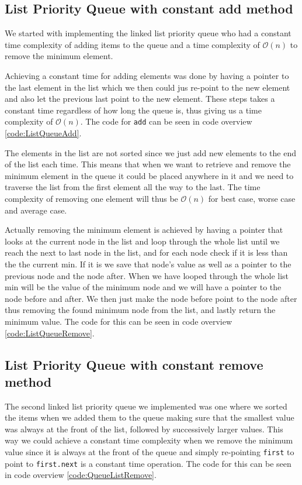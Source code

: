 \documentclass[a4paper,11pt]{article}
\begin{document}
\subsection{List Priority Queue with constant add method}
\label{ListQueue}
We started with implementing the linked list priority queue who had a constant time complexity of adding items 
to the queue and a time complexity of $\mathcal{O}(n)$ to remove the minimum element. 

Achieving a constant time for 
adding elements was done by having a pointer to the last element in the list which we then could jus re-point to 
the new element and also let the previous last point to the new element. These steps takes a constant time regardless 
of how long the queue is, thus giving us a time complexity of $\mathcal{O}(n)$. The code for {\tt add} can be seen
in code overview \ref{code:ListQueueAdd}.

The elements in the list are not sorted since we just add new elements to the end of the list each time. This means 
that when we want to retrieve and remove the minimum element in the queue it could be placed anywhere in it and 
we need to traverse the list from the first element all the way to the last. The time complexity of 
removing one element will thus be $\mathcal{O}(n)$ for best case, worse case and average case. 

Actually removing the minimum element is achieved by having a pointer that looks at the current node in the list and 
loop through the whole list until we reach the next to last node in the list, and for each node check if it is 
less than the the current min. If it is we save that node's value as well as a pointer to the previous node and the 
node after. When we have looped through the whole list min will be the value of the minimum node and we will have 
a pointer to the node before and after. We then just make the node before point to the node after thus removing the 
found minimum node from the list, and lastly return the minimum value. The code for this can be seen in code 
overview \ref{code:ListQueueRemove}.

\subsection{List Priority Queue with constant remove method}
\label{QueueList}
The second linked list priority queue we implemented was one where we sorted the items when we added them to the queue
making sure that the smallest value was always at the front of the list, followed by successively larger values. 
This way we could achieve a constant time complexity when we remove the minimum value since it is always at the front 
of the queue and simply re-pointing {\tt first} to point to {\tt first.next} is a constant time operation. The code 
for this can be seen in code overview \ref{code:QueueListRemove}.
\end{document}
